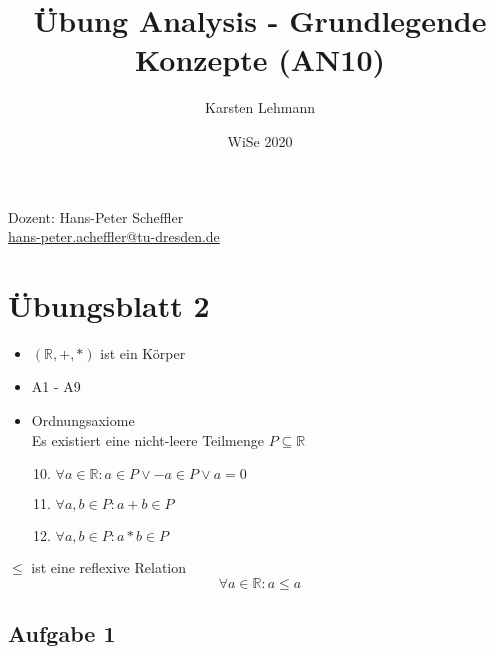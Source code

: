 \documentclass{article}
\author{Karsten Lehmann}
\date{WiSe 2020}
\title{Übung Analysis - Grundlegende Konzepte (AN10)}
\begin{document}
\maketitle

\vfill
\begin{center}
  Dozent: Hans-Peter Scheffler \\
  \href{mailto:hans-peter.scheffler@tu-dresden.de}{hans-peter.acheffler@tu-dresden.de}
\end{center}

\newpage

\section*{Übungsblatt 2}

\begin{itemize}
\item $(\mathbb{R}, +, *)$ ist ein Körper
\item A1 - A9
\item Ordnungsaxiome \\
  Es existiert eine nicht-leere Teilmenge $P \subseteq \mathbb{R}$
  \begin{enumerate}[label=(A\arabic*)]
    \setcounter{enumi}{9}
  \item $\forall a \in \mathbb{R} \colon a \in P \lor -a \in P \lor a = 0$
  \item $\forall a,b \in P \colon a + b \in P$
  \item $\forall a,b \in P \colon a * b \in P$
  \end{enumerate}
\end{itemize}


$\leq$ ist eine reflexive Relation
\[
  \forall a \in \mathbb{R} \colon a \leq a
\]

\subsection*{Aufgabe 1}
\end{document}
